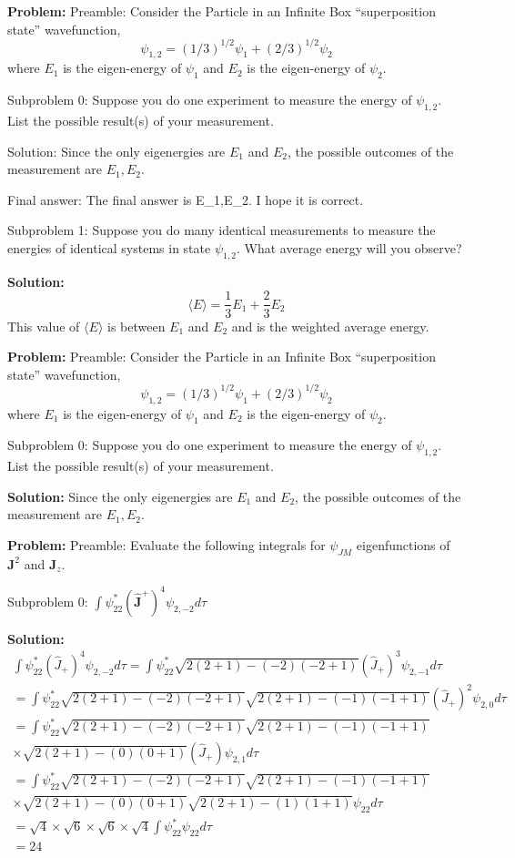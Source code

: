 \documentclass[10pt]{article}
\begin{document}
\textbf{Problem:}
Preamble: Consider the Particle in an Infinite Box ``superposition state'' wavefunction,
\[
\psi_{1,2}=(1 / 3)^{1 / 2} \psi_{1}+(2 / 3)^{1 / 2} \psi_{2}
\]
where $E_{1}$ is the eigen-energy of $\psi_{1}$ and $E_{2}$ is the eigen-energy of $\psi_{2}$.

Subproblem 0: Suppose you do one experiment to measure the energy of $\psi_{1,2}$.  List the possible result(s) of your measurement.


Solution: Since the only eigenergies are $E_{1}$ and $E_{2}$, the possible outcomes of the measurement are $\boxed{E_{1},E_{2}}$.

Final answer: The final answer is E_{1},E_{2}. I hope it is correct.

Subproblem 1: Suppose you do many identical measurements to measure the energies of identical systems in state $\psi_{1,2}$. What average energy will you observe?


\textbf{Solution:}
\[
\langle E\rangle =\boxed{\frac{1}{3} E_{1}+\frac{2}{3} E_{2}}
\]
This value of $\langle E\rangle$ is between $E_{1}$ and $E_{2}$ and is the weighted average energy.


\textbf{Problem:}
Preamble: Consider the Particle in an Infinite Box ``superposition state'' wavefunction,
\[
\psi_{1,2}=(1 / 3)^{1 / 2} \psi_{1}+(2 / 3)^{1 / 2} \psi_{2}
\]
where $E_{1}$ is the eigen-energy of $\psi_{1}$ and $E_{2}$ is the eigen-energy of $\psi_{2}$.

Subproblem 0: Suppose you do one experiment to measure the energy of $\psi_{1,2}$.  List the possible result(s) of your measurement.


\textbf{Solution:}
Since the only eigenergies are $E_{1}$ and $E_{2}$, the possible outcomes of the measurement are $\boxed{E_{1},E_{2}}$.


\textbf{Problem:}
Preamble: Evaluate the following integrals for $\psi_{J M}$ eigenfunctions of $\mathbf{J}^{2}$ and $\mathbf{J}_{z}$. 

Subproblem 0: $\int \psi_{22}^{*}\left(\widehat{\mathbf{J}}^{+}\right)^{4} \psi_{2,-2} d \tau$


\textbf{Solution:}
\[
\begin{gathered}
\int \psi_{22}^{*}\left(\hat{J}_{+}\right)^{4} \psi_{2,-2} d \tau=\int \psi_{22}^{*} \sqrt{2(2+1)-(-2)(-2+1)}\left(\hat{J}_{+}\right)^{3} \psi_{2,-1} d \tau \\
=\int \psi_{22}^{*} \sqrt{2(2+1)-(-2)(-2+1)} \sqrt{2(2+1)-(-1)(-1+1)}\left(\hat{J}_{+}\right)^{2} \psi_{2,0} d \tau \\
=\int \psi_{22}^{*} \sqrt{2(2+1)-(-2)(-2+1)} \sqrt{2(2+1)-(-1)(-1+1)} \\
\times \sqrt{2(2+1)-(0)(0+1)}\left(\hat{J}_{+}\right) \psi_{2,1} d \tau \\
=\int \psi_{22}^{*} \sqrt{2(2+1)-(-2)(-2+1)} \sqrt{2(2+1)-(-1)(-1+1)} \\
\times \sqrt{2(2+1)-(0)(0+1)} \sqrt{2(2+1)-(1)(1+1)} \psi_{22} d \tau \\
=\sqrt{4} \times \sqrt{6} \times \sqrt{6} \times \sqrt{4} \int \psi_{22}^{*} \psi_{22} d \tau \\
=\boxed{24}
\end{gathered}
\]
\end{document}
